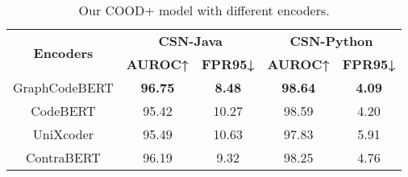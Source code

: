 \begin{table}[!tb]
\centering
\caption{Our COOD+ model with different encoders.}
\footnotesize
\label{tab:ablation}
\begin{adjustbox}{width=0.48\textwidth}\small
\begin{tabular}{c|cc|cc}
\toprule
\multirow{2}{*}{\textbf{Encoders}} & \multicolumn{2}{c|}{\textbf{CSN-Java}} & \multicolumn{2}{c}{\textbf{CSN-Python}} \\ \cline{2-5} 
                                   & \textbf{AUROC↑}    & \textbf{FPR95↓}   & \textbf{AUROC↑}    & \textbf{FPR95↓}    \\ \hline
GraphCodeBERT                      & \textbf{96.75}     & \textbf{8.48}     & \textbf{98.64}     & \textbf{4.09}               \\
CodeBERT                           & 95.42              & 10.27              & 98.59     & 4.20      \\
UniXcoder                          & 95.49              & 10.63              & 97.83              & 5.91               \\
ContraBERT                         & 96.19              & 9.32              & 98.25              & 4.76               \\ \bottomrule
\end{tabular}
\end{adjustbox}
\end{table}
